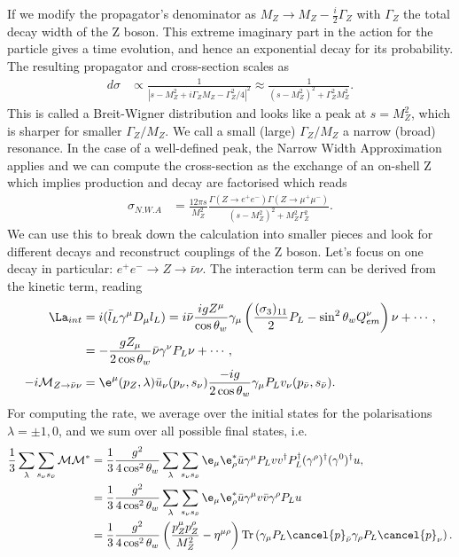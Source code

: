 \documentclass[a4paper, 11pt, normalem]{report}
\begin{document}
If we modify the propagator's denominator as $M_Z\to M_Z-\frac{i}{2}\Gamma_Z$ with $\Gamma_Z$ the total decay width of the Z boson.
This extreme imaginary part in the action for the particle gives a time evolution, and hence an exponential decay for its probability.
The resulting propagator and cross-section scales as
\begin{align}
    d\sigma &\propto \frac{1}{|s-M_Z^2+i\Gamma_ZM_Z - \Gamma_Z^2/4|^2} \approx \frac{1}{(s-M_Z^2)^2+\Gamma_Z^2M_Z^2}.
\end{align}
This is called a Breit-Wigner distribution and looks like a peak at $s=M_Z^2$, which is sharper for smaller $\Gamma_Z/M_Z$.
We call a small (large) $\Gamma_Z/M_Z$ a narrow (broad) resonance.
In the case of a well-defined peak, the Narrow Width Approximation applies and we can compute the cross-section as the exchange of an on-shell Z which implies production and decay are factorised which reads
\begin{align}
    \sigma_{N.W.A} &= \frac{12\pi s}{M_Z^2} \frac{\Gamma(Z\to e^+e^-)\Gamma(Z\to\mu^+\mu^-)}{(s-M_Z^2)^2+M_Z^2\Gamma_Z^2}.
\end{align}
We can use this to break down the calculation into smaller pieces and look for different decays and reconstruct couplings of the Z boson.
Let's focus on one decay in particular: $e^+e^-\to Z\to\bar{\nu}\nu$.
The interaction term can be derived from the kinetic term, reading
\begin{align}
    \La_{int} &= i(\bar{l}_L\gamma^\mu D_\mu l_L) = i\bar{\nu}\frac{igZ^\mu}{\cos\theta_w}\gamma_\mu\left(\frac{(\sigma_3)_{11}}{2}P_L - \sin^2\theta_w Q_{em}^\nu\right)\nu + \cdots, \\
              &= -\frac{gZ_\mu}{2\cos\theta_w}\bar{\nu}\gamma^\nu P_L\nu + \cdots, \\
    -i\mathcal{M}_{Z\to\bar{\nu}\nu} &= \e^\mu(p_Z,\lambda)\bar{u}_\nu(p_\nu,s_\nu)\frac{-ig}{2\cos\theta_w}\gamma_\mu P_Lv_\nu(p_{\bar{\nu}},s_{\bar{\nu}}).
\end{align}
For computing the rate, we average over the initial states for the polarisations $\lambda=\pm1,0$, and we sum over all possible final states, i.e.
\begin{align}
    \frac13 \sum_{\lambda} \sum_{s_\nu s_{\bar{\nu}}} \mathcal{M}\mathcal{M}^* &= \frac13 \frac{g^2}{4\cos^2\theta_w} \sum_\lambda \sum_{s_\nu s_{\bar{\nu}}} \e_\mu\e_\rho^* \bar{u}\gamma^\mu P_L vv^\dagger P_L^\dagger (\gamma^\rho)^\dagger (\gamma^0)^\dagger u, \\
                                                                               &= \frac13 \frac{g^2}{4\cos^2\theta_w} \sum_\lambda \sum_{s_\nu s_{\bar{\nu}}} \e_\mu\e_\rho^* \bar{u}\gamma^\mu v\bar{v}\gamma^\rho P_L u \\
                                                                               &= \frac13 \frac{g^2}{4\cos^2\theta_w} \left(\frac{p^\mu_Z p^\rho_Z}{M_Z^2} - \eta^{\mu\rho}\right)\text{Tr}\left(\gamma_\mu P_L\cancel{p}_{\bar{\nu}}\gamma_\rho P_L\cancel{p}_\nu\right).
\end{align}
\end{document}

